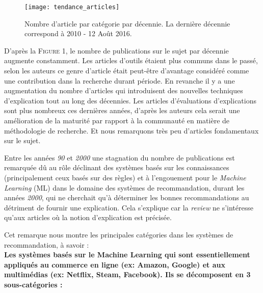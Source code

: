 \documentclass[a4paper, 11pt]{article}
\renewcommand{\textbf}[1]{\begingroup\bfseries\mathversion{bold}#1\endgroup}
\begin{document}
\begin{figure}[!ht]
\begin{center}
\texttt{[image: tendance\_articles]}
\caption{Nombre d'article par catégorie par décennie. La dernière décennie correspond à 2010 - 12 Août 2016.}
\end{center}
\end{figure}

D'après la \textsc{Figure 1}, le nombre de publications sur le sujet par décennie augmente constamment. Les articles d’outils étaient plus communs dans le passé, selon les auteurs ce genre d'article était peut-être d'avantage considéré comme une contribution dans la recherche durant période. En revanche il y a une augmentation du nombre d'articles qui introduisent des nouvelles techniques d’explication tout au long des décennies. Les articles d’évaluations d’explications sont plus nombreux ces dernières années, d'après les auteurs cela serait une amélioration de la maturité par rapport à la communauté en matière de méthodologie de recherche. Et nous remarquons très peu d'articles fondamentaux sur le sujet.

Entre les années \textit{90} et \textit{2000} une stagnation du nombre de publications est remarquée dû au rôle déclinant des systèmes basés sur les connaissances (principalement ceux basés sur des règles) et à l’engouement pour le \textit{Machine Learning} (ML) dans le domaine des systèmes de recommandation, durant les années \textit{2000}, qui ne cherchait qu'à déterminer les bonnes recommandations au détriment de fournir une explication. Cela s'explique car la \textit{review} ne s'intéresse qu'aux articles où la notion d'explication est précisée.

Cet remarque nous montre les principales catégories dans les systèmes de recommandation, à savoir :\\

\noindent \textbf{Les systèmes basés sur le Machine Learning} qui sont essentiellement appliqués au commerce en ligne (ex: Amazon, Google) et aux multimédias (ex: Netflix, Steam, Facebook). Ils se décomposent en 3 sous-catégories :
\end{document}
